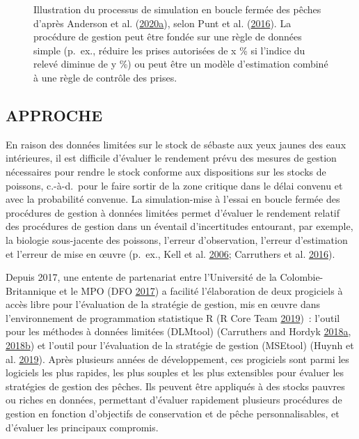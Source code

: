 \documentclass[11pt]{book}
\begin{document}
\begin{figure}[htb]

{\centering {} 

}

\caption{Illustration du processus de simulation en boucle fermée des pêches d'après Anderson et al. (\protect\hyperlink{ref-anderson2020gfmp}{2020}\protect\hyperlink{ref-anderson2020gfmp}{a}), selon Punt et al. (\protect\hyperlink{ref-punt2016}{2016}). La procédure de gestion peut être fondée sur une règle de données simple (p.~ex., réduire les prises autorisées de x \% si l'indice du relevé diminue de y \%) ou peut être un modèle d'estimation combiné à une règle de contrôle des prises.}\label{fig:mse-chart-basic}
\end{figure}
\hypertarget{sec:introduction-approach}{%
\subsection{APPROCHE}\label{sec:introduction-approach}}

En raison des données limitées sur le stock de sébaste aux yeux jaunes des eaux intérieures, il est difficile d'évaluer le rendement prévu des mesures de gestion nécessaires pour rendre le stock conforme aux dispositions sur les stocks de poissons, c.-à-d.~pour le faire sortir de la zone critique dans le délai convenu et avec la probabilité convenue. La simulation-mise à l'essai en boucle fermée des procédures de gestion à données limitées permet d'évaluer le rendement relatif des procédures de gestion dans un éventail d'incertitudes entourant, par exemple, la biologie sous-jacente des poissons, l'erreur d'observation, l'erreur d'estimation et l'erreur de mise en œuvre (p.~ex., Kell et al. \protect\hyperlink{ref-kell2006}{2006}; Carruthers et al. \protect\hyperlink{ref-carruthers2016}{2016}).

Depuis 2017, une entente de partenariat entre l'Université de la Colombie-Britannique et le MPO (DFO \protect\hyperlink{ref-dfo_dlmtool_2017}{2017}) a facilité l'élaboration de deux progiciels à accès libre pour l'évaluation de la stratégie de gestion, mis en œuvre dans l'environnement de programmation statistique R (R Core Team \protect\hyperlink{ref-r2019}{2019})~: l'outil pour les méthodes à données limitées (DLMtool) (Carruthers and Hordyk \protect\hyperlink{ref-carruthers2018}{2018}\protect\hyperlink{ref-carruthers2018}{a}, \protect\hyperlink{ref-carruthers_hordyk_2018}{2018}\protect\hyperlink{ref-carruthers_hordyk_2018}{b}) et l'outil pour l'évaluation de la stratégie de gestion (MSEtool) (Huynh et al. \protect\hyperlink{ref-huynh_msetool_2019}{2019}). Après plusieurs années de développement, ces progiciels sont parmi les logiciels les plus rapides, les plus souples et les plus extensibles pour évaluer les stratégies de gestion des pêches. Ils peuvent être appliqués à des stocks pauvres ou riches en données, permettant d'évaluer rapidement plusieurs procédures de gestion en fonction d'objectifs de conservation et de pêche personnalisables, et d'évaluer les principaux compromis.
\end{document}
